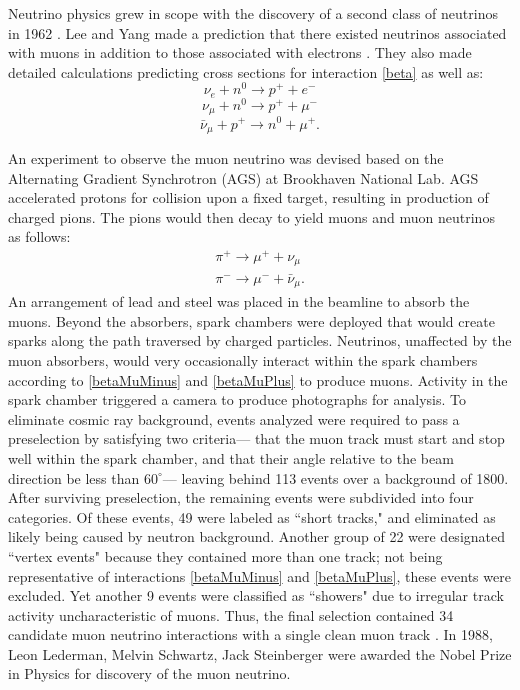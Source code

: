 Neutrino physics grew in scope  with the discovery of a second class of
neutrinos in 1962 \cite{numuDiscovery}.
Lee and Yang made a prediction that there existed neutrinos
associated with muons in addition to those associated with electrons
\cite{lee1957parity}.
They also made detailed calculations predicting cross sections for interaction
\eqref{beta} as well as:
\begin{equation} \label{betaMinus} \nu_e + n^0 \rightarrow p^+ + e^- \end{equation}
\begin{equation} \label{betaMuMinus}\nu_\mu + n^0 \rightarrow  p^+ + \mu^- \end{equation}
\begin{equation} \label{betaMuPlus}\bar{\nu}_\mu + p^+ \rightarrow n^0 + \mu^+ . \end{equation}


An experiment to observe the muon neutrino was devised based on the
Alternating Gradient Synchrotron (AGS) at Brookhaven National Lab.  AGS accelerated protons for collision upon a fixed target, resulting in production
of charged pions.
The pions would then decay to yield muons and muon neutrinos as follows:
\begin{equation} \label{pions} \begin{split}
\pi^+ \rightarrow \mu^+ + \nu_\mu {\ } \\
\pi^- \rightarrow \mu^- + \bar{\nu}_\mu.
\end{split} \end{equation}
An arrangement of lead and steel was placed in the beamline to absorb the
muons.  Beyond the absorbers, spark chambers were deployed that would create
sparks along the path traversed by charged particles.
Neutrinos, unaffected by the muon absorbers, would very occasionally
interact within the spark chambers according to \eqref{betaMuMinus} and
\eqref{betaMuPlus} to produce muons.
Activity in the spark chamber triggered a camera to produce photographs for
analysis.  To eliminate cosmic ray background, events analyzed were required
to pass a preselection by satisfying two criteria--- that the muon track must
start and stop well within the spark chamber, and that their angle relative to
the beam direction be less than $60^\circ$--- leaving behind 113 events over a
background of 1800.  After surviving preselection, the remaining events were
subdivided into four categories.  Of these events, 49 were labeled as
``short tracks," and eliminated as likely being caused by neutron background.
Another group of 22 were designated ``vertex events"  because they contained
more than one track; not being representative of interactions
\eqref{betaMuMinus} and \eqref{betaMuPlus}, these events were excluded.  Yet
another 9 events were classified as ``showers" due to irregular track activity
uncharacteristic of muons.  Thus, the final selection contained 34 candidate
muon neutrino interactions with a single clean muon track
\cite{numuDiscovery}.
In 1988, Leon Lederman, Melvin Schwartz, Jack Steinberger were awarded the
Nobel Prize in Physics for discovery of the muon neutrino.

